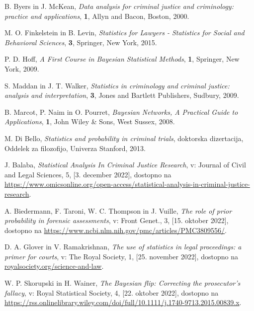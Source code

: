 \documentclass[mat1, tisk]{fmfdelo}
\theoremstyle{definition} %
\theoremstyle{trditev} %
\theoremstyle{izrek}
\begin{document}
\begin{thebibliography}{99}
        B. Byers in J. McKean, \emph{Data analysis for criminal justice and criminology: practice and applications}, \textbf{1}, Allyn and Bacon, Boston, 2000.

        M. O. Finkelstein in B. Levin, \emph{Statistics for Lawyers - Statistics for Social and Behavioral Sciences}, \textbf{3}, Springer, New York, 2015.

        P. D. Hoff, \emph{A First Course in Bayesian Statistical Methods}, \textbf{1}, Springer, New York, 2009.

        S. Maddan in J. T. Walker, \emph{Statistics in criminology and criminal justice: analysis and interpretation}, \textbf{3}, Jones and Bartlett Publishers, Sudbury, 2009.

        B. Marcot, P. Naim in O. Pourret, \emph{Bayesian Networks, A Practical Guide to Applications}, \textbf{1}, John Wiley \& Sons, West Sussex, 2008.

        M. Di Bello, \emph{Statistics and probability in criminal trials}, doktorska dizertacija, Oddelek za filozofijo, Univerza Stanford, 2013.

        J. Balaba, \emph{Statistical Analysis In Criminal Justice Research}, v: Journal of Civil and Legal Sciences, 5, [3. december 2022], dostopno na \url{https://www.omicsonline.org/open-access/statistical-analysis-in-criminal-justice-research}.

        A. Biedermann, F. Taroni, W. C. Thompson in J. Vuille, \emph{The role of prior probability in forensic assessments}, v: Front Genet., 3, [15. oktober 2022], dostopno na \url{https://www.ncbi.nlm.nih.gov/pmc/articles/PMC3809556/}.

        D. A. Glover in V. Ramakrishnan, \emph{The use of statistics in legal proceedings: a primer for courts}, v: The Royal Society, 1, [25. november 2022], dostopno na \url{royalsociety.org/science-and-law}.

        W. P. Skorupski in H. Wainer, \emph{The Bayesian flip: Correcting the prosecutor's fallacy}, v: Royal Statistical Society, 4, [22. oktober 2022], dostopno na \url{https://rss.onlinelibrary.wiley.com/doi/full/10.1111/j.1740-9713.2015.00839.x}.

\end{thebibliography}
\end{document}
